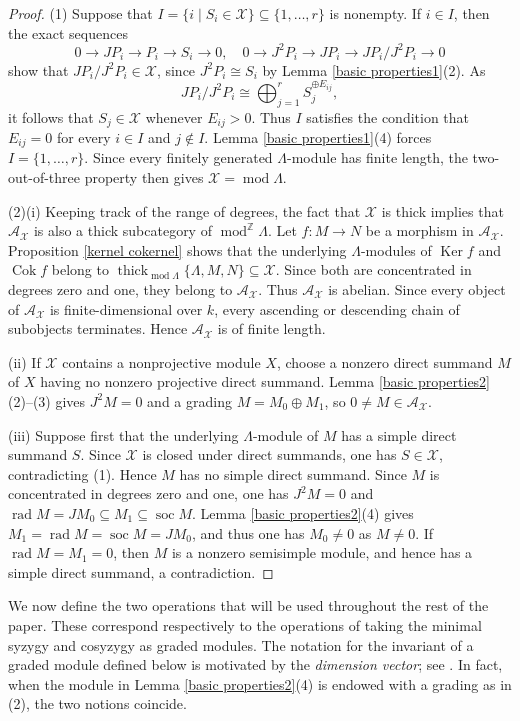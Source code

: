 \documentclass{amsart}
\theoremstyle{definition}
\theoremstyle{remark}
\numberwithin{equation}{thm}
\def\A{\mathcal{A}}
\def\cok{\operatorname{Cok}}
\def\gmod{\operatorname{mod}^{\mathbb{Z}}\!}
\def\ker{\operatorname{Ker}}
\def\L{\Lambda}
\def\mod{\operatorname{mod}}
\def\rad{\operatorname{rad}}
\def\soc{\operatorname{soc}}
\def\thick{\operatorname{thick}}
\def\X{\mathcal{X}}
\begin{document}
\begin{proof}
(1) Suppose that $I=\{i\mid S_i\in\X\}\subseteq\{1,\ldots,r\}$ is nonempty. If $i\in I$, then the exact sequences
$$
0\to JP_i\to P_i\to S_i\to0,
\quad
0\to J^2P_i\to JP_i\to JP_i/J^2P_i\to0
$$
show that $JP_i/J^2P_i\in\X$, since $J^2P_i\cong S_i$ by Lemma \ref{basic properties1}(2). As
$$
JP_i/J^2P_i\cong\bigoplus_{j=1}^r S_j^{\oplus E_{ij}}, 
$$ 
it follows that $S_j\in\X$ whenever $E_{ij}>0$.
Thus $I$ satisfies the condition that $E_{ij}=0$ for every $i\in I$ and $j\notin I$.
Lemma \ref{basic properties1}(4) forces $I=\{1,\ldots,r\}$.
Since every finitely generated $\L$-module has finite length, the two-out-of-three property then gives $\X=\mod\L$.

(2)(i) Keeping track of the range of degrees, the fact that $\X$ is thick implies that $\A_\X$ is also a thick subcategory of $\gmod\L$.
Let $f:M\to N$ be a morphism in $\A_\X$.
Proposition \ref{kernel cokernel} shows that the underlying $\L$-modules of $\ker f$ and $\cok f$ belong to $\thick_{\mod\L}\{\L,M,N\}\subseteq\X$.
Since both are concentrated in degrees zero and one, they belong to $\A_\X$.
Thus $\A_\X$ is abelian. 
Since every object of $\A_\X$ is finite-dimensional over $k$, every ascending or descending chain of subobjects terminates. Hence $\A_\X$ is of finite length.

(ii) If $\X$ contains a nonprojective module $X$, choose a nonzero direct summand $M$ of $X$ having no nonzero projective direct summand.
Lemma \ref{basic properties2}(2)--(3) gives $J^2M=0$ and a grading $M=M_0\oplus M_1$, so $0\ne M\in\A_\X$.

(iii) Suppose first that the underlying $\L$-module of $M$ has a simple direct summand $S$. Since $\X$ is closed under direct summands, one has $S\in\X$, contradicting (1). Hence $M$ has no simple direct summand.
Since $M$ is concentrated in degrees zero and one, one has $J^2M=0$ and $\rad M=JM_0\subseteq M_1\subseteq\soc M$.
Lemma \ref{basic properties2}(4) gives $M_1=\rad M=\soc M=JM_0$, and thus one has $M_0\ne0$ as $M\ne 0$.
If $\rad M=M_1=0$, then $M$ is a nonzero semisimple module, and hence has a simple direct summand, a contradiction.
\end{proof}

We now define the two operations that will be used throughout the rest of the paper. These correspond respectively to the operations of taking the minimal syzygy and cosyzygy as graded modules.
The notation for the invariant of a graded module defined below is motivated by the \textit{dimension vector}; see \cite{E}. In fact, when the module in Lemma \ref{basic properties2}(4) is endowed with a grading as in (2), the two notions coincide.
\end{document}
